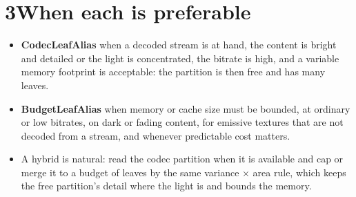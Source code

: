 \documentclass[10pt]{article}
\begin{document}
\section*{3\quad When each is preferable}

\begin{itemize}\setlength{\itemsep}{0pt}
\item \textbf{CodecLeafAlias} when a decoded stream is at hand, the content is bright and detailed or the light is concentrated, the bitrate is high, and a variable memory footprint is acceptable: the partition is then free and has many leaves.
\item \textbf{BudgetLeafAlias} when memory or cache size must be bounded, at ordinary or low bitrates, on dark or fading content, for emissive textures that are not decoded from a stream, and whenever predictable cost matters.
\item A hybrid is natural: read the codec partition when it is available and cap or merge it to a budget of leaves by the same variance $\times$ area rule, which keeps the free partition's detail where the light is and bounds the memory.
\end{itemize}
\end{document}
